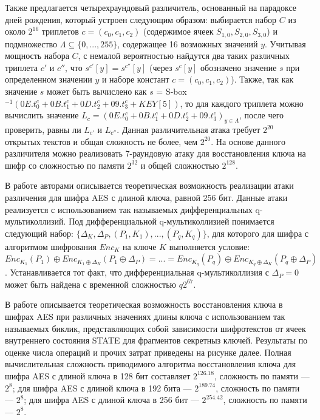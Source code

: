 \documentclass{./civarticle}
\begin{document}
Также предлагается четырехраундовый различитель, основанный на парадоксе дней рождения, который устроен следующим образом: выбирается набор $C$ из около $2^{16}$ триплетов $c = (c_0, c_1, c_2)$ (содержимое ячеек $S_{1, 0}, S_{2, 0}, S_{3, 0}$) и подмножество $\Lambda \subseteq \{0, ..., 255\}$, содержащее 16 возможных значений $y$.
Учитывая мощность набора $C$, с немалой вероятностью найдутся два таких различных триплета $c'$ и $c''$, что $s^{c'}[y] = s^{c''}[y]$ (через $s^{c}[y]$ обозначено значение $s$ при определенном значении $y$ и наборе констант $c = (c_0, c_1, c_2)$). Также, так как значение $s$ может быть вычислено как $s$ = S-box$^{-1}(0E.t_0^{c} + 0B.t_1^{c} + 0D.t_2^{c} + 09.t_3^{c} + KEY[5])$, то для каждого триплета можно вычислить значение $L_c = (0E.t_0^{c} + 0B.t_1^{c} + 0D.t_2^{c} + 09.t_3^{c})_{y \in \Lambda}$, после чего проверить, равны ли $L_{c'}$ и $L_{c''}$. Данная различительная атака требует $2^{20}$ открытых текстов и общая сложность не более, чем $2^{20}$. На основе данного различителя можно реализовать 7-раундовую атаку для восстановления ключа на шифр со сложностью по памяти $2^{32}$ и общей сложностью $2^{128}$.

В работе \cite{aes1} авторами описывается теоретическая возможность реализации атаки различения для шифра AES с длиной ключа, равной 256 бит. Данные атаки реализуется с использованием так называемых дифференциальных q-мультиколлизий. Под дифференциальной q-мультиколлизией понимается следующий набор: $\{ \Delta_K, \Delta_P, (P_1, K_1), ..., (P_q, K_q) \}$, для которого для шифра с алгоритмом шифрования $Enc_K$ на ключе $K$ выполняется условие: $Enc_{K_1}(P_1) \oplus Enc_{K_1 \oplus \Delta_K}(P_1 \oplus \Delta_P) = ... = Enc_{K_q}(P_q) \oplus Enc_{K_q \oplus \Delta_K}(P_q \oplus \Delta_P)$. Устанавливается тот факт, что дифференциальная q-мультиколлизия с $\Delta_P = 0$ может быть найдена с временной сложностью $q2^{67}$. 

В работе \cite{aes2} описывается теоретическая возможность восстановления ключа в шифрах AES при различных значениях длины ключа с использованием так называемых биклик, представляющих собой зависимости шифротекстов от ячеек внутреннего состояния STATE для фрагментов секретныз ключей.
Результаты по оценке числа операций и прочих затрат приведены на рисунке далее. Полная вычислительная сложность приводимого алгоритма восстановления ключа для шифра AES с длиной ключа в 128 бит составляет $2^{126.18}$, сложность по памяти --- $2^8$; для шифра AES с длиной ключа в 192 бита --- $2^{189.74}$, сложность по памяти --- $2^8$; для шифра AES с длиной ключа в 256 бит --- $2^{254.42}$, сложность по памяти --- $2^8$.
\end{document}
